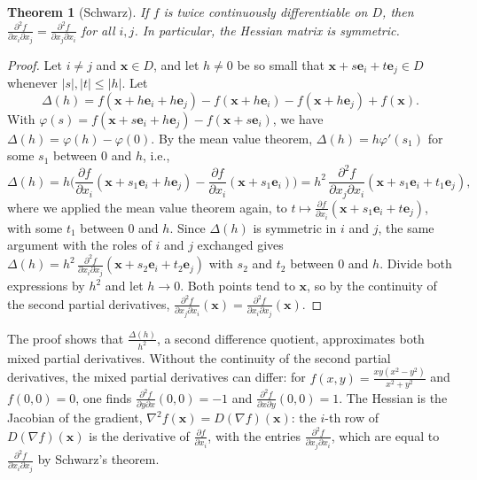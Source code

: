 \documentclass[11pt]{article}
\theoremstyle{definition}
\theoremstyle{plain}
\newtheorem{theorem}[definition]{Theorem}
\theoremstyle{remark}
\begin{document}
\begin{theorem}[Schwarz]\label{thm:schwarz}
    If $f$ is twice continuously differentiable on $D$, then $\frac{\partial^2 f}{\partial x_i \partial x_j} = \frac{\partial^2 f}{\partial x_j \partial x_i}$ for all $i, j$. In particular, the Hessian matrix is symmetric.
\end{theorem}

\begin{proof}
    Let $i \neq j$ and $\mathbf{x} \in D$, and let $h \neq 0$ be so small that $\mathbf{x} + s\mathbf{e}_i + t\mathbf{e}_j \in D$ whenever $|s|, |t| \leq |h|$. Let
    \[\Delta(h) = f(\mathbf{x} + h\mathbf{e}_i + h\mathbf{e}_j) - f(\mathbf{x} + h\mathbf{e}_i) - f(\mathbf{x} + h\mathbf{e}_j) + f(\mathbf{x}).\]
    With $\varphi(s) = f(\mathbf{x} + s\mathbf{e}_i + h\mathbf{e}_j) - f(\mathbf{x} + s\mathbf{e}_i)$, we have $\Delta(h) = \varphi(h) - \varphi(0)$. By the mean value theorem, $\Delta(h) = h\varphi'(s_1)$ for some $s_1$ between $0$ and $h$, i.e.,
    \[\Delta(h) = h\Big(\frac{\partial f}{\partial x_i}(\mathbf{x} + s_1\mathbf{e}_i + h\mathbf{e}_j) - \frac{\partial f}{\partial x_i}(\mathbf{x} + s_1\mathbf{e}_i)\Big) = h^2\,\frac{\partial^2 f}{\partial x_j \partial x_i}(\mathbf{x} + s_1\mathbf{e}_i + t_1\mathbf{e}_j),\]
    where we applied the mean value theorem again, to $t \mapsto \frac{\partial f}{\partial x_i}(\mathbf{x} + s_1\mathbf{e}_i + t\mathbf{e}_j)$, with some $t_1$ between $0$ and $h$. Since $\Delta(h)$ is symmetric in $i$ and $j$, the same argument with the roles of $i$ and $j$ exchanged gives $\Delta(h) = h^2\,\frac{\partial^2 f}{\partial x_i \partial x_j}(\mathbf{x} + s_2\mathbf{e}_i + t_2\mathbf{e}_j)$ with $s_2$ and $t_2$ between $0$ and $h$. Divide both expressions by $h^2$ and let $h \to 0$. Both points tend to $\mathbf{x}$, so by the continuity of the second partial derivatives, $\frac{\partial^2 f}{\partial x_j \partial x_i}(\mathbf{x}) = \frac{\partial^2 f}{\partial x_i \partial x_j}(\mathbf{x})$.
\end{proof}

The proof shows that $\frac{\Delta(h)}{h^2}$, a second difference quotient, approximates both mixed partial derivatives. Without the continuity of the second partial derivatives, the mixed partial derivatives can differ: for $f(x, y) = \frac{xy(x^2 - y^2)}{x^2 + y^2}$ and $f(0, 0) = 0$, one finds $\frac{\partial^2 f}{\partial y \partial x}(0, 0) = -1$ and $\frac{\partial^2 f}{\partial x \partial y}(0, 0) = 1$. The Hessian is the Jacobian of the gradient, $\nabla^2 f(\mathbf{x}) = D(\nabla f)(\mathbf{x})$: the $i$-th row of $D(\nabla f)(\mathbf{x})$ is the derivative of $\frac{\partial f}{\partial x_i}$, with the entries $\frac{\partial^2 f}{\partial x_j \partial x_i}$, which are equal to $\frac{\partial^2 f}{\partial x_i \partial x_j}$ by Schwarz's theorem.
\end{document}
